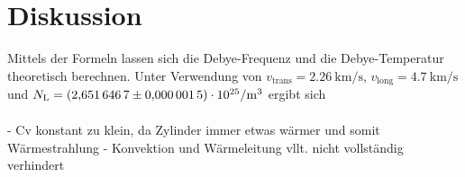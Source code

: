 \section{Diskussion}
\label{sec:Diskussion}

Mittels der Formeln %
lassen sich die Debye-Frequenz und die Debye-Temperatur theoretisch
berechnen. Unter Verwendung von
$v_\text{trans}=\SI{2.26}{\kilo\meter\per\second}$,
$v_\text{long}=\SI{4.7}{\kilo\meter\per\second}$ \cite[p.~5]{anleitung}
und $N_\text{L}=\SI{2.6516467(15)e25}{\raiseto{-3}\meter}$ \cite{Codata}
ergibt sich
\begin{align*}
\end{align*}


- Cv konstant zu klein, da Zylinder immer etwas wärmer und somit Wärmestrahlung
- Konvektion und Wärmeleitung vllt. nicht vollständig verhindert
